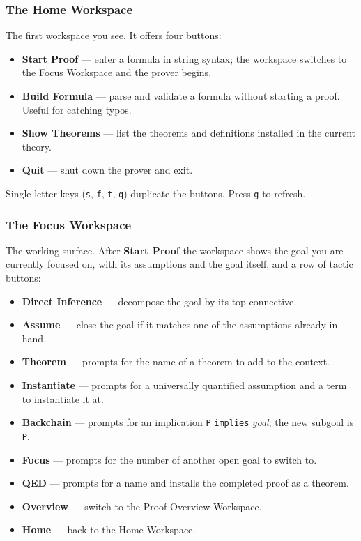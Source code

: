 \subsubsection{The Home Workspace}

The first workspace you see.  It offers four buttons:

\begin{itemize}
\item \textbf{Start Proof} --- enter a formula in string syntax; the
  workspace switches to the Focus Workspace and the prover begins.
\item \textbf{Build Formula} --- parse and validate a formula
  without starting a proof.  Useful for catching typos.
\item \textbf{Show Theorems} --- list the theorems and definitions
  installed in the current theory.
\item \textbf{Quit} --- shut down the prover and exit.
\end{itemize}

\noindent
Single-letter keys (\texttt{s}, \texttt{f}, \texttt{t}, \texttt{q})
duplicate the buttons.  Press \texttt{g} to refresh.

\subsubsection{The Focus Workspace}

The working surface.  After \textbf{Start Proof} the workspace shows
the goal you are currently focused on, with its assumptions and the
goal itself, and a row of tactic buttons:

\begin{itemize}
\item \textbf{Direct Inference} --- decompose the goal by its top
  connective.
\item \textbf{Assume} --- close the goal if it matches one of the
  assumptions already in hand.
\item \textbf{Theorem} --- prompts for the name of a theorem to add
  to the context.
\item \textbf{Instantiate} --- prompts for a universally quantified
  assumption and a term to instantiate it at.
\item \textbf{Backchain} --- prompts for an implication
  \texttt{P} \texttt{implies} \textit{goal}; the new subgoal is
  \texttt{P}.
\item \textbf{Focus} --- prompts for the number of another open
  goal to switch to.
\item \textbf{QED} --- prompts for a name and installs the
  completed proof as a theorem.
\item \textbf{Overview} --- switch to the Proof Overview Workspace.
\item \textbf{Home} --- back to the Home Workspace.
\end{itemize}

